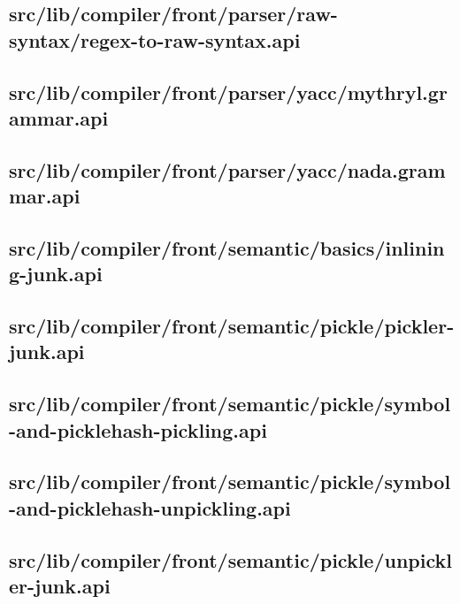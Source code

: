 \subsection{src/lib/compiler/front/parser/raw-syntax/regex-to-raw-syntax.api}


\subsection{src/lib/compiler/front/parser/yacc/mythryl.grammar.api}


\subsection{src/lib/compiler/front/parser/yacc/nada.grammar.api}


\subsection{src/lib/compiler/front/semantic/basics/inlining-junk.api}


\subsection{src/lib/compiler/front/semantic/pickle/pickler-junk.api}


\subsection{src/lib/compiler/front/semantic/pickle/symbol-and-picklehash-pickling.api}


\subsection{src/lib/compiler/front/semantic/pickle/symbol-and-picklehash-unpickling.api}


\subsection{src/lib/compiler/front/semantic/pickle/unpickler-junk.api}


